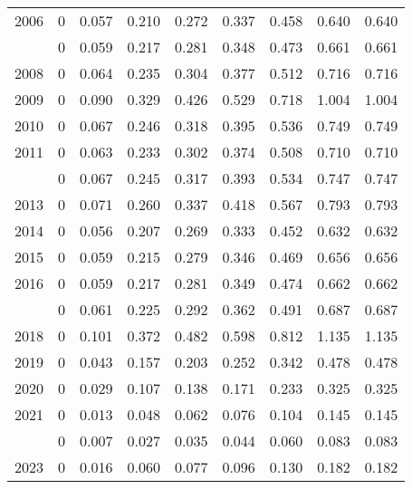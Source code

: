 \documentclass[
]{article}
\begin{document}
\begin{longtable}[t]{lrrrrrrrr}
2006 & 0 & 0.057 & 0.210 & 0.272 & 0.337 & 0.458 & 0.640 & 0.640\\
\addlinespace
2007 & 0 & 0.059 & 0.217 & 0.281 & 0.348 & 0.473 & 0.661 & 0.661\\
2008 & 0 & 0.064 & 0.235 & 0.304 & 0.377 & 0.512 & 0.716 & 0.716\\
2009 & 0 & 0.090 & 0.329 & 0.426 & 0.529 & 0.718 & 1.004 & 1.004\\
2010 & 0 & 0.067 & 0.246 & 0.318 & 0.395 & 0.536 & 0.749 & 0.749\\
2011 & 0 & 0.063 & 0.233 & 0.302 & 0.374 & 0.508 & 0.710 & 0.710\\
\addlinespace
2012 & 0 & 0.067 & 0.245 & 0.317 & 0.393 & 0.534 & 0.747 & 0.747\\
2013 & 0 & 0.071 & 0.260 & 0.337 & 0.418 & 0.567 & 0.793 & 0.793\\
2014 & 0 & 0.056 & 0.207 & 0.269 & 0.333 & 0.452 & 0.632 & 0.632\\
2015 & 0 & 0.059 & 0.215 & 0.279 & 0.346 & 0.469 & 0.656 & 0.656\\
2016 & 0 & 0.059 & 0.217 & 0.281 & 0.349 & 0.474 & 0.662 & 0.662\\
\addlinespace
2017 & 0 & 0.061 & 0.225 & 0.292 & 0.362 & 0.491 & 0.687 & 0.687\\
2018 & 0 & 0.101 & 0.372 & 0.482 & 0.598 & 0.812 & 1.135 & 1.135\\
2019 & 0 & 0.043 & 0.157 & 0.203 & 0.252 & 0.342 & 0.478 & 0.478\\
2020 & 0 & 0.029 & 0.107 & 0.138 & 0.171 & 0.233 & 0.325 & 0.325\\
2021 & 0 & 0.013 & 0.048 & 0.062 & 0.076 & 0.104 & 0.145 & 0.145\\
\addlinespace
2022 & 0 & 0.007 & 0.027 & 0.035 & 0.044 & 0.060 & 0.083 & 0.083\\
2023 & 0 & 0.016 & 0.060 & 0.077 & 0.096 & 0.130 & 0.182 & 0.182\\*
\end{longtable}
\end{document}
